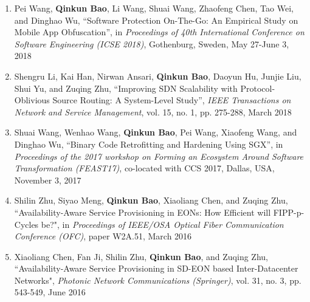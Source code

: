 \begin{enumerate}
\item Pei Wang, \textbf{Qinkun Bao}, Li Wang, Shuai Wang, Zhaofeng Chen, Tao Wei, and Dinghao Wu, ``Software Protection On-The-Go: An Empirical Study on Mobile App Obfuscation'', in \emph{Proceedings of 40th International Conference on Software Engineering (ICSE 2018)}, Gothenburg, Sweden, May 27-June 3, 2018
  
\item Shengru Li, Kai Han, Nirwan Ansari, \textbf{Qinkun Bao}, Daoyun Hu, Junjie Liu, Shui Yu, and Zuqing Zhu, ``Improving SDN Scalability with Protocol-Oblivious Source Routing: A System-Level Study'', \emph{IEEE Transactions on Network and Service Management}, vol. 15, no. 1, pp. 275-288, March 2018
 
\item Shuai Wang, Wenhao Wang, \textbf{Qinkun Bao}, Pei Wang, Xiaofeng Wang, and Dinghao Wu, ``Binary Code Retrofitting and Hardening Using SGX'', in \emph{Proceedings of the 2017 workshop on Forming an Ecosystem Around Software Transformation (FEAST17)}, co-located with CCS 2017, Dallas, USA, November 3, 2017

\item Shilin Zhu, Siyao Meng, \textbf{Qinkun Bao}, Xiaoliang Chen, and Zuqing Zhu, ``Availability-Aware Service Provisioning in EONs: How Efficient will FIPP-p-Cycles be?",  in \emph{Proceedings of IEEE/OSA Optical Fiber Communication Conference (OFC)}, paper W2A.51, March 2016
 
\item Xiaoliang Chen, Fan Ji, Shilin Zhu, \textbf{Qinkun Bao}, and Zuqing Zhu, ``Availability-Aware Service Provisioning in SD-EON based Inter-Datacenter Networks",  \emph{Photonic Network Communications (Springer)}, vol. 31, no. 3, pp. 543-549, June 2016
\end{enumerate}





